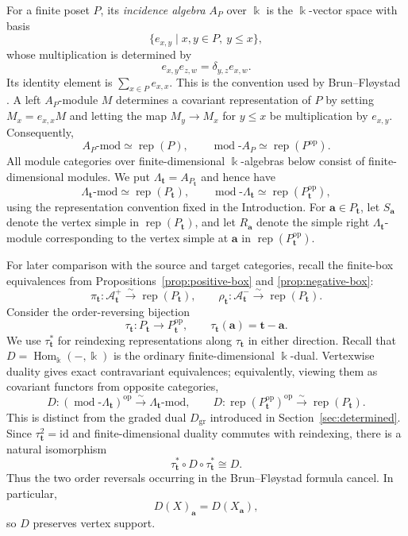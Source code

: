 \documentclass[12pt,reqno]{amsart}
\theoremstyle{definition}
\theoremstyle{remark}
\newcommand{\Rep}{\operatorname{rep}}
\newcommand{\Hom}{\operatorname{Hom}}
\newcommand{\modcat}{\operatorname{mod}}
\newcommand{\Dgr}{D_{\mathrm{gr}}}
\begin{document}
For a finite poset $P$, its \emph{incidence algebra} $A_P$ over $\Bbbk$
is the $\Bbbk$-vector space with basis
\[
\{e_{x,y}\mid x,y\in P,\ y\le x\},
\]
whose multiplication is determined by
\[
e_{x,y}e_{z,w}=\delta_{y,z}e_{x,w}.
\]
Its identity element is $\sum_{x\in P}e_{x,x}$.  This is the convention
used by Brun--Fl\o ystad \cite{BF}.  A left $A_P$-module $M$ determines a
covariant representation of $P$ by setting $M_x=e_{x,x}M$ and letting the
map $M_y\to M_x$ for $y\le x$ be multiplication by $e_{x,y}$.
Consequently,
\[
A_P\text{-mod}\simeq\Rep(P),
\qquad
\modcat\text{-}A_P\simeq\Rep(P^{\mathrm{op}}).
\]
All module categories over finite-dimensional $\Bbbk$-algebras below
consist of finite-dimensional modules.  We put
$\Lambda_{\mathbf t}=A_{P_{\mathbf t}}$ and hence have
\[
\Lambda_{\mathbf t}\text{-mod}\simeq\Rep(P_{\mathbf t}),
\qquad
\modcat\text{-}\Lambda_{\mathbf t}\simeq\Rep(P_{\mathbf t}^{\mathrm{op}}),
\]
using the representation convention fixed in the Introduction.  For
$\mathbf a\in P_{\mathbf t}$, let $S_{\mathbf a}$ denote the vertex simple in
$\Rep(P_{\mathbf t})$, and let $R_{\mathbf a}$ denote the simple right
$\Lambda_{\mathbf t}$-module corresponding to the vertex simple at
$\mathbf a$ in $\Rep(P_{\mathbf t}^{\mathrm{op}})$.

For later comparison with the source and target categories, recall the
finite-box equivalences from Propositions~\ref{prop:positive-box} and
\ref{prop:negative-box}:
\[
\pi_{\mathbf t}:\mathcal A^+_{\mathbf t}\xrightarrow{\sim}\Rep(P_{\mathbf t}),
\qquad
\rho_{\mathbf t}:\mathcal A^-_{\mathbf t}\xrightarrow{\sim}\Rep(P_{\mathbf t}).
\]
Consider the order-reversing bijection
\[
\tau_{\mathbf t}:P_{\mathbf t}\longrightarrow P_{\mathbf t}^{\mathrm{op}},
\qquad
\tau_{\mathbf t}(\mathbf a)=\mathbf t-\mathbf a.
\]
We use $\tau_{\mathbf t}^*$ for reindexing representations along
$\tau_{\mathbf t}$ in either direction.  Recall that
$D=\Hom_\Bbbk(-,\Bbbk)$ is the ordinary finite-dimensional $\Bbbk$-dual.  Vertexwise duality gives exact contravariant equivalences; equivalently,
viewing them as covariant functors from opposite categories,
\[
D:(\modcat\text{-}\Lambda_{\mathbf t})^{\mathrm{op}}
\xrightarrow{\sim}
\Lambda_{\mathbf t}\text{-mod},
\qquad
D:\Rep(P_{\mathbf t}^{\mathrm{op}})^{\mathrm{op}}
\xrightarrow{\sim}
\Rep(P_{\mathbf t}).
\]
This is distinct from the graded dual $\Dgr$ introduced in Section~\ref{sec:determined}.  Since $\tau_{\mathbf t}^2=\mathrm{id}$ and finite-dimensional duality commutes with reindexing, there is a natural isomorphism
\[
\tau_{\mathbf t}^*\circ D\circ\tau_{\mathbf t}^*\cong D.
\]
Thus the two order reversals occurring in the Brun--Fl\o ystad formula cancel.  In particular,
\[
D(X)_{\mathbf a}=D(X_{\mathbf a}),
\]
so $D$ preserves vertex support.
\end{document}
